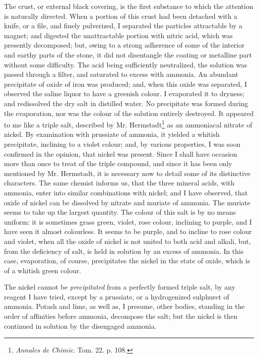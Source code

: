 \documentclass[a4paper, 12pt, oneside]{article}
\begin{document}
The crust, or external black covering, is the first substance to which the attention is naturally directed. When a portion of this crust had been detached with a knife, or a file, and finely pulverized, I separated the particles attractable by a magnet; and digested the unattractable portion with nitric acid, which was presently decomposed; but, owing to a strong adherence of some of the interior and earthy parts of the stone, it did not disentangle the coating or metalline part without some difficulty. The acid being sufficiently neutralized, the solution was passed through a filter, and saturated to excess with ammonia. An abundant precipitate of oxide of iron was produced; and, when this oxide was separated, I observed the saline liquor to have a greenish colour. I evaporated it to dryness; and redissolved the dry salt in distilled water. No precipitate was formed during the evaporation, nor was the colour of the solution entirely destroyed. It appeared to me like a triple salt, described by Mr. Hermstadt\footnote{\emph{Annales de Chimie}. Tom. 22. p. 108.} as an ammoniacal nitrate of nickel. By examination with prussiate of ammonia, it yielded a whitish precipitate, inclining to a violet colour; and, by various properties, I was soon confirmed in the opinion, that nickel was present. Since I shall have occasion more than once to treat of the triple compound, and since it has been only mentioned by Mr. Hermstadt, it is necessary now to detail some of its distinctive characters. The same chemist informs us, that the three mineral acids, with ammonia, enter into similar combinations with nickel; and I have observed, that oxide of nickel can be dissolved by nitrate and muriate of ammonia. The muriate seems to take up the largest quantity. The colour of this salt is by no means uniform: it is sometimes grass green, violet, rose colour, inclining to purple, and I have seen it almost colourless. It seems to be purple, and to incline to rose colour and violet, when all the oxide of nickel is not united to both acid and alkali, but, from the deficiency of salt, is held in solution by an excess of ammonia. In this case, evaporation, of course, precipitates the nickel in the state of oxide, which is of a whitish green colour.

The nickel cannot be \emph{precipitated} from a perfectly formed triple salt, by any reagent I have tried, except by a prussiate, or a hydrogenized sulphuret of ammonia. Potash and lime, as well as, I presume, other bodies, standing in the order of affinities before ammonia, decompose the salt; but the nickel is then continued in solution by the disengaged ammonia.
\end{document}
